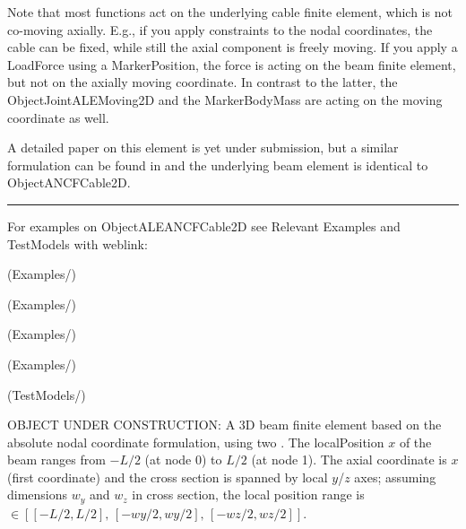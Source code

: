     Note that most functions act on the underlying cable finite element, which is not co-moving axially. E.g., if you apply constraints
    to the nodal coordinates, the cable can be fixed, while still the axial component is freely moving.
    If you apply a LoadForce using a MarkerPosition, the force is acting on the beam finite element, but not on the axially moving coordinate.
    In contrast to the latter, the ObjectJointALEMoving2D and the MarkerBodyMass are acting on the moving coordinate as well.

    A detailed paper on this element is yet under submission, but a similar formulation can be found in \cite{PechsteinGerstmayr2013ale} and 
    the underlying beam element is identical to ObjectANCFCable2D.
\vspace{6pt}\par\noindent\rule{\textwidth}{0.4pt}
%
\noindent For examples on ObjectALEANCFCable2D see Relevant Examples and TestModels with weblink:
\bi
\item {} (Examples/)
\item {} (Examples/)
\item {} (Examples/)
\item {} (Examples/)
\item {} (TestModels/)

\ei

%
\newpage


\label{sec:item:ObjectANCFBeam}
OBJECT UNDER CONSTRUCTION: A 3D beam finite element based on the absolute nodal coordinate formulation, using two . The localPosition $x$ of the beam ranges from $-L/2$ (at node 0) to $L/2$ (at node 1). The axial coordinate is $x$ (first coordinate) and the cross section is spanned by local $y$/$z$ axes; assuming dimensions $w_y$ and $w_z$ in cross section, the local position range is $\in [[-L/2,L/2],\, [-wy/2,wy/2],\, [-wz/2,wz/2] ]$.
\vspace{12pt}\\

